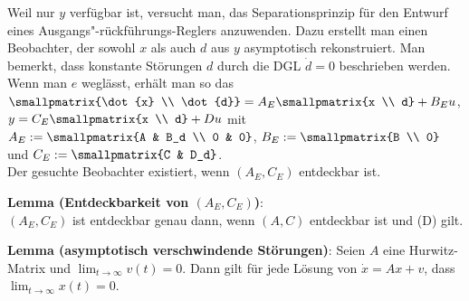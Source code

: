 Weil nur $y$ verfügbar ist, versucht man, das Separationsprinzip für den Entwurf eines
Ausgangs"-rückführungs-Reglers anzuwenden.
Dazu erstellt man einen Beobachter, der sowohl $x$ als auch $d$ aus $y$ asymptotisch rekonstruiert.
Man bemerkt, dass konstante Störungen $d$ durch die DGL $\dot{d} = 0$ beschrieben werden.\\
Wenn man $e$ weglässt, erhält man so das \\
$\smallpmatrix{\dot{x} \\ \dot{d}} = A_E \smallpmatrix{x \\ d} + B_E u$,
$y = C_E \smallpmatrix{x \\ d} + Du$ mit
$A_E := \smallpmatrix{A & B_d \\ 0 & 0}$,
$B_E := \smallpmatrix{B \\ 0}$ und
$C_E := \smallpmatrix{C & D_d}$.\\
Der gesuchte Beobachter existiert, wenn $(A_E, C_E)$ entdeckbar ist.

\textbf{Lemma (Entdeckbarkeit von $(A_E, C_E)$)}:\\
$(A_E, C_E)$ ist entdeckbar genau dann, wenn
$(A, C)$ entdeckbar ist und (D) gilt.

\textbf{Lemma (asymptotisch verschwindende Störungen)}:
Seien $A$ eine Hurwitz-Matrix und $\lim_{t \to \infty} v(t) = 0$.
Dann gilt für jede Lösung von $\dot{x} = Ax + v$, dass $\lim_{t \to \infty} x(t) = 0$.

\linie

